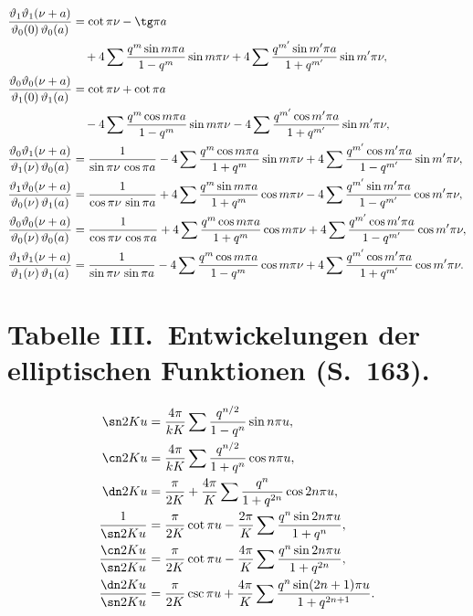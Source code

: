 \documentclass[12pt,a4paper]{article}
\begin{document}
\begin{align*}
\frac{\vartheta_1\vartheta_1(\nu+a)}{\vartheta_0(0)\,\vartheta_0(a)} &= \cot\pi\nu - \tg\pi a \\
&\quad + 4\sum \frac{q^m \sin m\pi a}{1-q^m} \sin m\pi\nu + 4\sum \frac{q^{m'} \sin m'\pi a}{1+q^{m'}} \sin m'\pi\nu,\\
\frac{\vartheta_0\vartheta_0(\nu+a)}{\vartheta_1(0)\,\vartheta_1(a)} &= \cot\pi\nu + \cot\pi a \\
&\quad - 4\sum \frac{q^m \cos m\pi a}{1-q^m} \sin m\pi\nu - 4\sum \frac{q^{m'} \cos m'\pi a}{1+q^{m'}} \sin m'\pi\nu,\\
\frac{\vartheta_0\vartheta_1(\nu+a)}{\vartheta_1(\nu)\,\vartheta_0(a)} &= \frac{1}{\sin\pi\nu\,\cos\pi a} - 4\sum \frac{q^m \cos m\pi a}{1+q^m} \sin m\pi\nu + 4\sum \frac{q^{m'} \cos m'\pi a}{1-q^{m'}} \sin m'\pi\nu,\\
\frac{\vartheta_1\vartheta_0(\nu+a)}{\vartheta_0(\nu)\,\vartheta_1(a)} &= \frac{1}{\cos\pi\nu\,\sin\pi a} + 4\sum \frac{q^m \sin m\pi a}{1+q^m} \cos m\pi\nu - 4\sum \frac{q^{m'} \sin m'\pi a}{1-q^{m'}} \cos m'\pi\nu,\\
\frac{\vartheta_0\vartheta_0(\nu+a)}{\vartheta_0(\nu)\,\vartheta_0(a)} &= \frac{1}{\cos\pi\nu\,\cos\pi a} + 4\sum \frac{q^m \cos m\pi a}{1+q^m} \cos m\pi\nu + 4\sum \frac{q^{m'} \cos m'\pi a}{1-q^{m'}} \cos m'\pi\nu,\\
\frac{\vartheta_1\vartheta_1(\nu+a)}{\vartheta_1(\nu)\,\vartheta_1(a)} &= \frac{1}{\sin\pi\nu\,\sin\pi a} - 4\sum \frac{q^m \cos m\pi a}{1-q^m} \cos m\pi\nu + 4\sum \frac{q^{m'} \cos m'\pi a}{1+q^{m'}} \cos m'\pi\nu.
\end{align*}

\newpage
\section*{Tabelle III.\ Entwickelungen der elliptischen Funktionen (S.~163).}

\begin{align*}
\sn 2Ku &= \frac{4\pi}{kK} \sum \frac{q^{n/2}}{1-q^n} \sin n\pi u,\\
\cn 2Ku &= \frac{4\pi}{kK} \sum \frac{q^{n/2}}{1+q^n} \cos n\pi u,\\
\dn 2Ku &= \frac{\pi}{2K} + \frac{4\pi}{K} \sum \frac{q^n}{1+q^{2n}} \cos 2n\pi u,\\
\frac{1}{\sn 2Ku} &= \frac{\pi}{2K} \cot\pi u - \frac{2\pi}{K} \sum \frac{q^n \sin 2n\pi u}{1+q^n},\\
\frac{\cn 2Ku}{\sn 2Ku} &= \frac{\pi}{2K} \cot\pi u - \frac{4\pi}{K} \sum \frac{q^n \sin 2n\pi u}{1+q^{2n}},\\
\frac{\dn 2Ku}{\sn 2Ku} &= \frac{\pi}{2K} \csc\pi u + \frac{4\pi}{K} \sum \frac{q^n \sin(2n+1)\pi u}{1+q^{2n+1}}.
\end{align*}
\end{document}

